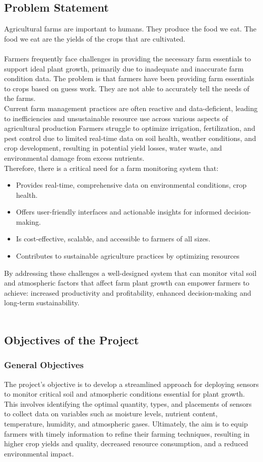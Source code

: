 \documentclass[12pt, a4paper]{article}
\begin{document}
\subsection{Problem Statement}
Agricultural farms are important to humans. They produce the food we eat. The food we eat are the yields of the crops that are cultivated.\\ \\
Farmers frequently face challenges in providing the necessary farm essentials to support ideal plant growth, primarily due to inadequate and inaccurate farm condition data. The problem is that farmers have been providing farm essentials to crops based on guess work. They are not able to accurately tell the needs of the farms.
\\
Current farm management practices are often reactive and data-deficient, leading to inefficiencies and unsustainable resource use across various aspects of agricultural production Farmers struggle to optimize irrigation, fertilization, and pest control due to limited real-time data on soil health, weather conditions, and crop development, resulting in potential yield losses, water waste, and environmental damage from excess nutrients.
\\
Therefore, there is a critical need for a farm monitoring system that:
\begin{itemize}
 \item Provides real-time, comprehensive data on environmental conditions, crop health.
 \item Offers user-friendly interfaces and actionable insights for informed decision-making.
 \item Is cost-effective, scalable, and accessible to farmers of all sizes.
 \item Contributes to sustainable agriculture practices by optimizing resources
\end{itemize}
By addressing these challenges a well-designed system that can monitor vital soil and atmospheric factors that affect farm plant growth can empower farmers to achieve: increased productivity and profitability, enhanced decision-making and long-term sustainability. \\ \\



\newpage
\subsection{Objectives of the Project}
\subsubsection{General Objectives}
The project's objective is to develop a streamlined approach for deploying sensors to monitor critical soil and atmospheric conditions essential for plant growth. This involves identifying the optimal quantity, types, and placements of sensors to collect data on variables such as moisture levels, nutrient content, temperature, humidity, and atmospheric gases. Ultimately, the aim is to equip farmers with timely information to refine their farming techniques, resulting in higher crop yields and quality, decreased resource consumption, and a reduced environmental impact.
\end{document}
